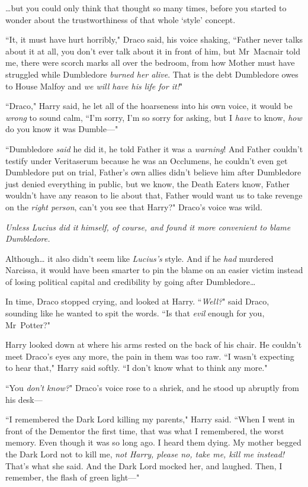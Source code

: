 {\ldots}but you could only think that thought so many times, before you started to wonder about the trustworthiness of that whole `style' concept.

``It, it must have hurt horribly," Draco said, his voice shaking, ``Father never talks about it at all, you don't ever talk about it in front of him, but Mr~Macnair told me, there were scorch marks all over the bedroom, from how Mother must have struggled while Dumbledore \emph{burned her alive}. That is the debt Dumbledore owes to House Malfoy and \emph{we will have his life for it!}"

``Draco," Harry said, he let all of the hoarseness into his own voice, it would be \emph{wrong} to sound calm, ``I'm sorry, I'm so sorry for asking, but I \emph{have} to know, \emph{how} do you know it was Dumble—"

``Dumbledore \emph{said} he did it, he told Father it was a \emph{warning}! And Father couldn't testify under Veritaserum because he was an Occlumens, he couldn't even get Dumbledore put on trial, Father's own allies didn't believe him after Dumbledore just denied everything in public, but we know, the Death Eaters know, Father wouldn't have any reason to lie about that, Father would want us to take revenge on the \emph{right person}, can't you see that Harry?" Draco's voice was wild.

\emph{Unless Lucius did it himself, of course, and found it more convenient to blame Dumbledore.}

Although{\ldots} it also didn't seem like \emph{Lucius's} style. And if he \emph{had} murdered Narcissa, it would have been smarter to pin the blame on an easier victim instead of losing political capital and credibility by going after Dumbledore{\ldots}

In time, Draco stopped crying, and looked at Harry. ``\emph{Well?}" said Draco, sounding like he wanted to spit the words. ``Is that \emph{evil} enough for you, Mr~Potter?"

Harry looked down at where his arms rested on the back of his chair. He couldn't meet Draco's eyes any more, the pain in them was too raw. ``I wasn't expecting to hear that," Harry said softly. ``I don't know what to think any more."

``You \emph{don't know?}" Draco's voice rose to a shriek, and he stood up abruptly from his desk—

``I remembered the Dark Lord killing my parents," Harry said. ``When I went in front of the Dementor the first time, that was what I remembered, the worst memory. Even though it was so long ago. I heard them dying. My mother begged the Dark Lord not to kill me, \emph{not Harry, please no, take me, kill me instead!} That's what she said. And the Dark Lord mocked her, and laughed. Then, I remember, the flash of green light—"

